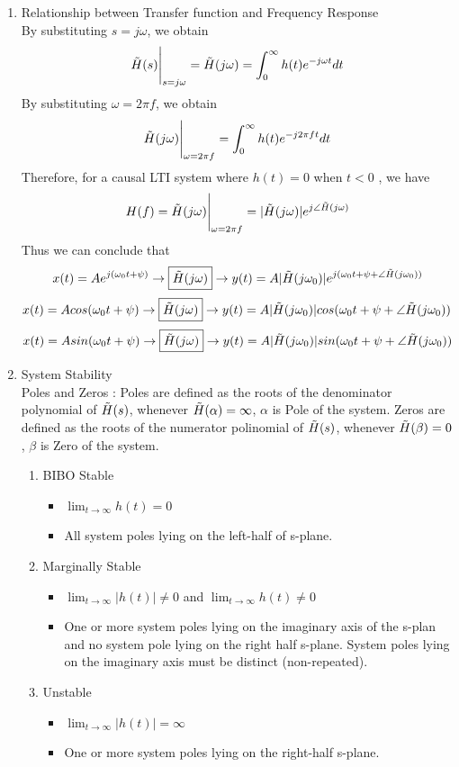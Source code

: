 \documentclass{article}
\begin{document}
\begin{enumerate}
    \item Relationship between Transfer function and Frequency Response \\
    By substituting $s = j\omega$, we obtain
    \[\Tilde{H}(s)\Bigg|_{s=j\omega}=\Tilde{H}(j\omega)=\int^\infty_0h(t)e^{-j\omega t}dt\]
    By substituting $\omega = 2\pi f$, we obtain
    \[\Tilde{H}(j\omega)\Bigg|_{\omega=2\pi f} = \int^\infty_0h(t)e^{-j2\pi ft}dt\]
    Therefore, for a causal LTI system where $h(t) = 0$ when $t < 0$ , we have 
    \[H(f) = \Tilde{H}(j\omega)\Bigg|_{\omega = 2\pi f} = |\Tilde{H}(j\omega)|e^{j\angle \Tilde{H}(j\omega)}\]
    Thus we can conclude that
    \[x(t) = Ae^{j(\omega_0t+\psi)}\rightarrow\boxed{\Tilde{H}(j\omega)}\rightarrow y(t)=A|\Tilde{H}(j\omega_0)|e^{j(\omega_0t+\psi+\angle\Tilde{H}(j\omega_0))}\]
    \[x(t) = Acos(\omega_0t+\psi)\rightarrow\boxed{\Tilde{H}(j\omega)}\rightarrow y(t)=A|\Tilde{H}(j\omega_0)|cos(\omega_0t+\psi+\angle\Tilde{H}(j\omega_0))\]
    \[x(t) = Asin(\omega_0t+\psi)\rightarrow\boxed{\Tilde{H}(j\omega)}\rightarrow y(t)=A|\Tilde{H}(j\omega_0)|sin(\omega_0t+\psi+\angle\Tilde{H}(j\omega_0))\]
    \item System Stability \\
    Poles and Zeros : Poles are defined as the roots of the denominator polynomial of $\Tilde{H}(s)$, whenever $\Tilde{H}(\alpha) = \infty$, $\alpha$ is Pole of the system. Zeros are defined as the roots of the numerator polinomial of $\Tilde{H}(s)$, whenever $\Tilde{H}(\beta) = 0$, $\beta$ is Zero of the system.
    \begin{enumerate}
        \item BIBO Stable
        \begin{itemize}
            \item $\displaystyle\lim_{t \rightarrow \infty } h(t) = 0$
            \item All system poles lying on the left-half of s-plane.
        \end{itemize}
        \item Marginally Stable
        \begin{itemize}
            \item $\displaystyle \lim_{t \rightarrow \infty }|h(t)| \neq 0$ and $\displaystyle \lim_{t \rightarrow \infty}h(t) \neq 0$
            \item One or more system poles lying on the imaginary axis of the s-plan and no system pole lying on the right half s-plane. System poles lying on the imaginary axis must be distinct (non-repeated).
        \end{itemize}
        \item Unstable 
        \begin{itemize}
            \item $\displaystyle\lim_{t \rightarrow \infty } |h(t)| = \infty $
            \item One or more system poles lying on the right-half s-plane.
        \end{itemize}
    \end{enumerate}
\end{enumerate}
\end{document}

